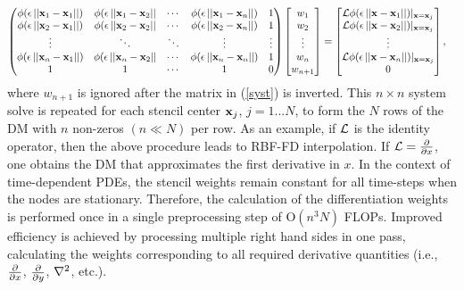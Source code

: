 \begin{align}
\begin{pmatrix}
\phi(\epsilon\left|\left|\mathbf{x}_1-\mathbf{x}_1\right|\right|) & \phi(\epsilon\left|\left|\mathbf{x}_1-\mathbf{x}_2\right|\right| & \cdots & \phi(\epsilon\left|\left|\mathbf{x}_1-\mathbf{x}_n\right|\right|) & 1 \\
\phi(\epsilon\left|\left|\mathbf{x}_2-\mathbf{x}_1\right|\right|) & \phi(\epsilon\left|\left|\mathbf{x}_2-\mathbf{x}_2\right|\right| & \cdots &
\phi(\epsilon\left|\left|\mathbf{x}_2-\mathbf{x}_n\right|\right|) & 1\\
\vdots & \ddots & \ddots & \vdots & \vdots\\
\phi(\epsilon\left|\left|\mathbf{x}_n-\mathbf{x}_1\right|\right|) & \phi(\epsilon\left|\left|\mathbf{x}_n-\mathbf{x}_2\right|\right| & \cdots &
\phi(\epsilon\left|\left|\mathbf{x}_n-\mathbf{x}_n\right|\right|) & 1 \\
1 & 1 & \cdots & 1 & 0
\end{pmatrix}
\begin{bmatrix} w_1 \\ w_2 \\ \vdots \\ w_n  \\ w_{n+1}\end{bmatrix}
&=
\begin{bmatrix} \mathcal{L}\phi(\epsilon\left|\left|\mathbf{x}-\mathbf{x}_{1}\right|\right|)|_{\mathbf{x}=\mathbf{x}_{j}} \\
                \mathcal{L}\phi(\epsilon\left|\left|\mathbf{x}-\mathbf{x}_{2}\right|\right|)|_{\mathbf{x}=\mathbf{x}_{j}} \\ \vdots \\  \mathcal{L}\phi(\epsilon\left|\left|\mathbf{x}-\mathbf{x}_{n}\right|\right|)|_{\mathbf{x}=\mathbf{x}_{j}}\\
                0
\end{bmatrix},
\label{syst}
\end{align}
where $w_{n+1}$ is ignored after the matrix in ({\ref{syst}}) is inverted.
This $n \times n$ system solve is repeated for each stencil center  $\mathbf{x}_j$, $j=1...N$, to form the $N$ rows of the DM  with $n$ non-zeros $(n\ll N)$ per row.
As an example, if $\diffop$ is the identity operator, 
then the above procedure leads to RBF-FD interpolation. If $\mathcal{L}=\frac{\partial }{\partial x}$, one obtains the DM that approximates the first derivative in $x$. In the context of time-dependent PDEs,  the stencil weights remain constant for all time-steps when the nodes are stationary. Therefore, the calculation of the 
differentiation weights is performed once in a single preprocessing step of O$(n^3N)$ 
FLOPs.
Improved efficiency is achieved
by processing multiple right hand sides in one pass, calculating the weights
corresponding to all required derivative quantities (i.e., $\frac{\partial }{\partial x}$, $\frac{\partial }{\partial y}$, $\Laplacian$, etc.).

